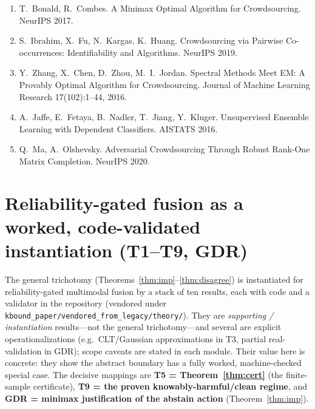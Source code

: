 \documentclass[conference]{IEEEtran}
\theoremstyle{plain}
\theoremstyle{definition}
\begin{document}
\begin{enumerate}
\item T.~Bonald, R.~Combes. A Minimax Optimal Algorithm for Crowdsourcing. NeurIPS 2017.
\item S.~Ibrahim, X.~Fu, N.~Kargas, K.~Huang. Crowdsourcing via Pairwise Co-occurrences: Identifiability and Algorithms. NeurIPS 2019.
\item Y.~Zhang, X.~Chen, D.~Zhou, M.~I.~Jordan. Spectral Methods Meet EM: A Provably Optimal Algorithm for Crowdsourcing. Journal of Machine Learning Research 17(102):1--44, 2016.
\item A.~Jaffe, E.~Fetaya, B.~Nadler, T.~Jiang, Y.~Kluger. Unsupervised Ensemble Learning with Dependent Classifiers. AISTATS 2016.
\item Q.~Ma, A.~Olshevsky. Adversarial Crowdsourcing Through Robust Rank-One Matrix Completion. NeurIPS 2020.
\end{enumerate}

\appendix
\section{Reliability-gated fusion as a worked, code-validated instantiation (T1--T9, GDR)}
\label{app:stack}
The general trichotomy (Theorems~\ref{thm:imp}--\ref{thm:disagree}) is instantiated for
reliability-gated multimodal fusion by a stack of ten results, each with code and a
validator in the repository (vendored under
\texttt{kbound\_paper/vendored\_from\_legacy/theory/}). They are \emph{supporting /
instantiation} results---not the general trichotomy---and several are explicit
operationalizations (e.g.\ CLT/Gaussian approximations in T3, partial real-validation in
GDR); scope caveats are stated in each module. Their value here is concrete: they show
the abstract boundary has a fully worked, machine-checked special case. The decisive
mappings are \textbf{T5 = Theorem~\ref{thm:cert}} (the finite-sample certificate),
\textbf{T9 = the proven knowably-harmful/clean regime}, and \textbf{GDR = minimax
justification of the abstain action} (Theorem~\ref{thm:imp}).
\end{document}
